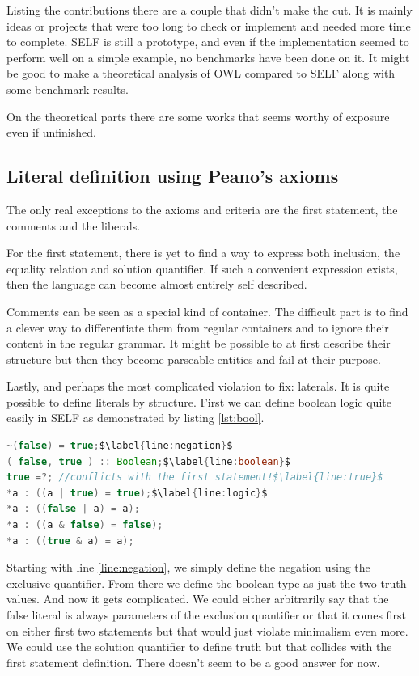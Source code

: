 \documentclass[11pt,a4paper,twoside,openright,titlepage,numbers=noenddot,headinclude,cleardoublepage=empty,openany]{scrreprt}
\theoremstyle{plain}
\theoremstyle{definition}
\theoremstyle{remark}
\begin{document}
Listing the contributions there are a couple that didn't make the cut.
It is mainly ideas or projects that were too long to check or implement
and needed more time to complete. SELF is still a prototype, and even if
the implementation seemed to perform well on a simple example, no
benchmarks have been done on it. It might be good to make a theoretical
analysis of OWL compared to SELF along with some benchmark results.

On the theoretical parts there are some works that seems worthy of
exposure even if unfinished.

\hypertarget{sec:peano}{%
\subsection{Literal definition using Peano's axioms}\label{sec:peano}}

The only real exceptions to the axioms and criteria are the first
statement, the comments and the liberals.

For the first statement, there is yet to find a way to express both
inclusion, the equality relation and solution quantifier. If such a
convenient expression exists, then the language can become almost
entirely self described.

Comments can be seen as a special kind of container. The difficult part
is to find a clever way to differentiate them from regular containers
and to ignore their content in the regular grammar. It might be possible
to at first describe their structure but then they become parseable
entities and fail at their purpose.

Lastly, and perhaps the most complicated violation to fix: laterals. It
is quite possible to define literals by structure. First we can define
boolean logic quite easily in SELF as demonstrated by
listing \ref{lst:bool}.

\begin{lstlisting}[language=Java, caption={Possible definition of boolean logic in SELF.}, escapechar={$}, label=lst:bool]
~(false) = true;$\label{line:negation}$
( false, true ) :: Boolean;$\label{line:boolean}$
true =?; //conflicts with the first statement!$\label{line:true}$
*a : ((a | true) = true);$\label{line:logic}$
*a : ((false | a) = a);
*a : ((a & false) = false); 
*a : ((true & a) = a);
\end{lstlisting}

Starting with line \ref{line:negation}, we simply define the negation
using the exclusive quantifier. From there we define the boolean type as
just the two truth values. And now it gets complicated. We could either
arbitrarily say that the false literal is always parameters of the
exclusion quantifier or that it comes first on either first two
statements but that would just violate minimalism even more. We could
use the solution quantifier to define truth but that collides with the
first statement definition. There doesn't seem to be a good answer for
now.
\end{document}

